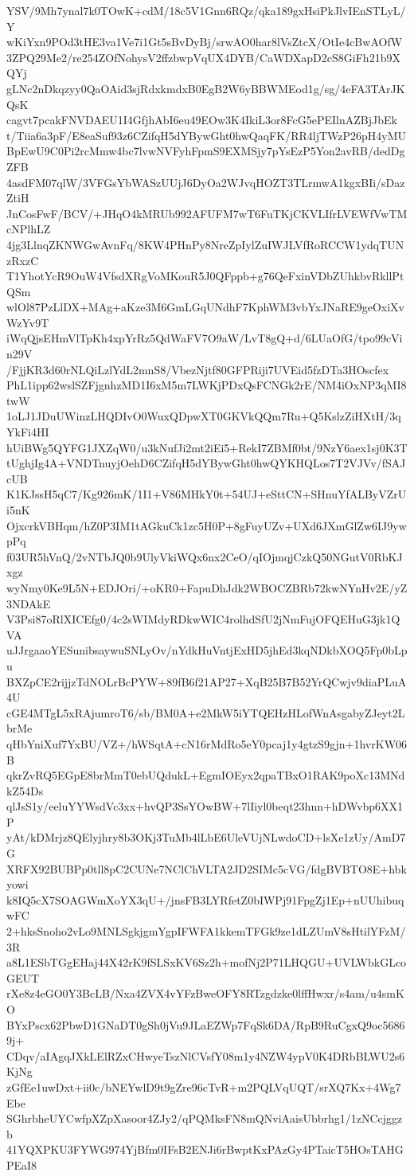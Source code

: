 YSV/9Mh7ynal7k0TOwK+cdM/18c5V1Gnn6RQz/qka189gxHsiPkJlvIEnSTLyL/Y
wKiYxn9POd3tHE3va1Ve7i1Gt5sBvDyBj/srwAO0har8lVsZtcX/OtIe4cBwAOfW
3ZPQ29Me2/re254ZOfNohysV2ffzbwpVqUX4DYB/CaWDXapD2cS8GiFh21b9XQYj
gLNc2nDkqzyy0QaOAid3sjRdxkmdxB0EgB2W6yBBWMEod1g/sg/4eFA3TArJKQsK
cagvt7pcakFNVDAEU1I4GfjhAbI6eu49EOw3K4IkiL3or8FcG5ePEIlnAZBjJbEk
t/Tiia6a3pF/E8eaSuf93z6CZifqH5dYBywGht0hwQaqFK/RR4ljTWzP26pH4yMU
BpEwU9C0Pi2rcMmw4bc7lvwNVFyhFpmS9EXMSjy7pYsEzP5Yon2avRB/dedDgZFB
4asdFM07qlW/3VFGsYbWASzUUjJ6DyOa2WJvqHOZT3TLrmwA1kgxBIi/sDazZtiH
JnCosFwF/BCV/+JHqO4kMRUb992AFUFM7wT6FuTKjCKVLIfrLVEWfVwTMcNPlhLZ
4jg3LlnqZKNWGwAvnFq/8KW4PHnPy8NreZpIylZuIWJLVfRoRCCW1ydqTUNzRxzC
T1YhotYcR9OuW4VfsdXRgVoMKouR5J0QFppb+g76QeFxinVDbZUhkbvRkllPtQSm
wlOl87PzLlDX+MAg+aKze3M6GmLGqUNdhF7KphWM3vbYxJNaRE9geOxiXvWzYv9T
iWqQjsEHmVlTpKh4xpYrRz5QdWaFV7O9aW/LvT8gQ+d/6LUaOfG/tpo99cVin29V
/FjjKR3d60rNLQiLzlYdL2mnS8/VbezNjtf80GFPRiji7UVEid5fzDTa3HOscfex
PhL1ipp62wslSZFjgnhzMD1I6xM5m7LWKjPDxQsFCNGk2rE/NM4iOxNP3qMI8twW
1oLJ1JDuUWinzLHQDIvO0WuxQDpwXT0GKVkQQm7Ru+Q5KslzZiHXtH/3qYkFi4HI
hUiBWg5QYFG1JXZqW0/u3kNufJi2mt2iEi5+RekI7ZBMf0bt/9NzY6aex1sj0K3T
tUghjIg4A+VNDTnuyjOehD6CZifqH5dYBywGht0hwQYKHQLos7T2VJVv/fSAJcUB
K1KJssH5qC7/Kg926mK/1I1+V86MHkY0t+54UJ+eSttCN+SHnuYfALByVZrUi5nK
OjxcrkVBHqm/hZ0P3IM1tAGkuCk1zc5H0P+8gFuyUZv+UXd6JXmGlZw6IJ9ywpPq
f03UR5hVnQ/2vNTbJQ0b9UlyVkiWQx6nx2CeO/qIOjmqjCzkQ50NGutV0RbKJxgz
wyNmy0Ke9L5N+EDJOri/+oKR0+FapuDhJdk2WBOCZBRb72kwNYnHv2E/yZ3NDAkE
V3Psi87oRlXICEfg0/4c2sWIMdyRDkwWIC4rolhdSfU2jNmFujOFQEHuG3jk1QVA
uJJrgaaoYESunibsaywuSNLyOv/nYdkHuVntjExHD5jhEd3kqNDkbXOQ5Fp0bLpu
BXZpCE2rijjzTdNOLrBcPYW+89fB6f21AP27+XqB25B7B52YrQCwjv9diaPLuA4U
cGE4MTgL5xRAjumroT6/sb/BM0A+e2MkW5iYTQEHzHLofWnAsgabyZJeyt2LbrMe
qHbYniXuf7YxBU/VZ+/hWSqtA+cN16rMdRo5eY0pcaj1y4gtzS9gjn+1hvrKW06B
qkrZvRQ5EGpE8brMmT0ebUQdukL+EgmIOEyx2qpaTBxO1RAK9poXc13MNdkZ54Ds
qlJsS1y/eeluYYWsdVc3xx+hvQP3SsYOwBW+7lIiyl0beqt23hnn+hDWvbp6XX1P
yAt/kDMrjz8QElyjhry8b3OKj3TuMb4lLbE6UleVUjNLwdoCD+lsXe1zUy/AmD7G
XRFX92BUBPp0tll8pC2CUNe7NClChVLTA2JD2SIMc5cVG/fdgBVBTO8E+hbkyowi
k8IQ5cX7SOAGWmXoYX3qU+/jnsFB3LYRfetZ0bIWPj91FpgZj1Ep+nUUhibuqwFC
2+hksSnoho2vLo9MNLSgkjgmYgpIFWFA1kkemTFGk9ze1dLZUmV8sHtilYFzM/3R
a8L1ESbTGgEHaj44X42rK9fSLSxKV6Sz2h+mofNj2P71LHQGU+UVLWbkGLcoGEUT
rXe8z4eGO0Y3BcLB/Nxa4ZVX4vYFzBweOFY8RTzgdzke0lffHwxr/s4am/u4smKO
BYxPscx62PbwD1GNaDT0gSh0jVu9JLaEZWp7FqSk6DA/RpB9RuCgxQ9oc56869j+
CDqv/aIAgqJXkLElRZxCHwyeTszNlCVsfY08m1y4NZW4ypV0K4DRbBLWU2s6KjNg
zGfEe1uwDxt+ii0c/bNEYwlD9t9gZre96cTvR+m2PQLVqUQT/srXQ7Kx+4Wg7Ebe
SGhrbheUYCwfpXZpXasoor4ZJy2/qPQMksFN8mQNviAaisUbbrhg1/1zNCcjggzb
41YQXPKU3FYWG974YjBfm0IFsB2ENJi6rBwptKxPAzGy4PTaicT5HOsTAHGPEaI8
